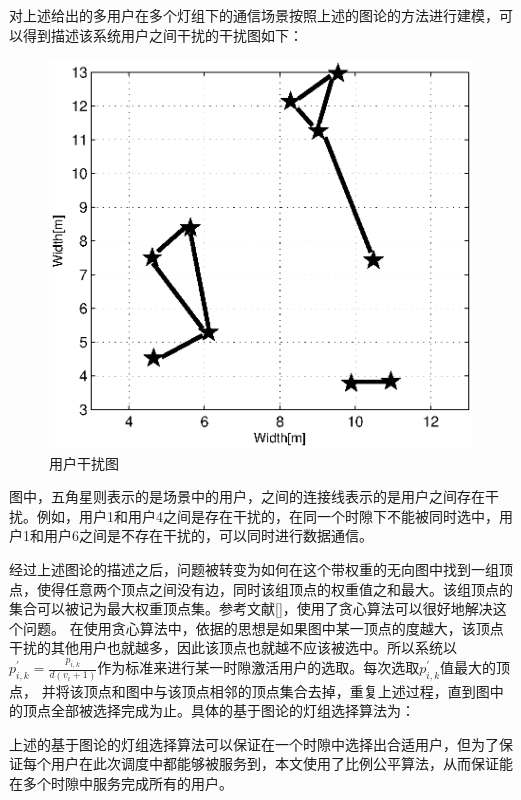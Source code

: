 对上述给出的多用户在多个灯组下的通信场景按照上述的图论的方法进行建模，可以得到描述该系统用户之间干扰的干扰图如下：

\begin{figure}[htbp]
    \centering
	\includegraphics[width=\textwidth]{figures/chapter-5/InterferenceGraph.eps}
	\caption{用户干扰图}
	\label{fig:interference-graph}
\end{figure}

图中，五角星则表示的是场景中的用户，之间的连接线表示的是用户之间存在干扰。例如，用户1和用户4之间是存在干扰的，在同一个时隙下不能被同时选中，用户1和用户6之间是不存在干扰的，可以同时进行数据通信。

经过上述图论的描述之后，问题被转变为如何在这个带权重的无向图中找到一组顶点，使得任意两个顶点之间没有边，同时该组顶点的权重值之和最大。该组顶点的集合可以被记为最大权重顶点集。参考文献[]，使用了贪心算法可以很好地解决这个问题。
在使用贪心算法中，依据的思想是如果图中某一顶点的度越大，该顶点干扰的其他用户也就越多，因此该顶点也就越不应该被选中。所以系统以$p_{i,k}^{'}=\frac{p_{i,k}}{d(v_{i}+1)}$作为标准来进行某一时隙激活用户的选取。每次选取$p_{i,k}^{'}$值最大的顶点，
并将该顶点和图中与该顶点相邻的顶点集合去掉，重复上述过程，直到图中的顶点全部被选择完成为止。具体的基于图论的灯组选择算法为：

%
%

上述的基于图论的灯组选择算法可以保证在一个时隙中选择出合适用户，但为了保证每个用户在此次调度中都能够被服务到，本文使用了比例公平算法，从而保证能在多个时隙中服务完成所有的用户。

